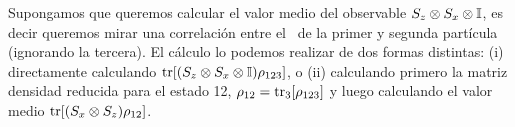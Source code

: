 \documentclass[10pt, a4paper]{article}
\numberwithin{equation}{subsection}
\begin{document}

Supongamos que queremos calcular el valor medio del observable $S_z \otimes S_x
\otimes \mathbb{I}$, es decir queremos mirar una correlación entre el \spin~de la
primer y segunda partícula (ignorando la tercera). El cálculo lo podemos
realizar de dos formas distintas: (i) directamente calculando $\tr[(S_z \otimes
S_x \otimes \mathbb{I}) \rho_{123}]$, o (ii) calculando primero la matriz densidad
reducida para el estado 12, $\rho_{12} = \tr_3[\rho_{123}]$ y luego calculando
el valor medio $\tr[(S_x \otimes S_z) \rho_{12}]$.
\end{document}
